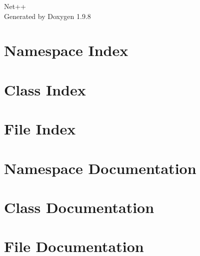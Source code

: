 \documentclass[twoside]{book}
\newcommand{\+}{\discretionary{\mbox{\scriptsize$\hookleftarrow$}}{}{}}
\newcommand{\clearemptydoublepage}{%
    \newpage{\pagestyle{empty}\cleardoublepage}%
  }
\begin{document}
  \raggedbottom
    \hypersetup{pageanchor=false,
                bookmarksnumbered=true,
                pdfencoding=unicode
               }
  \begin{titlepage}
  \vspace*{7cm}
  \begin{center}%
  {\Large Net++}\\
  \vspace*{1cm}
  {\large Generated by Doxygen 1.9.8}\\
  \end{center}
  \end{titlepage}
  \clearemptydoublepage
  \tableofcontents
  \clearemptydoublepage
  \hypersetup{pageanchor=true}
\chapter{Namespace Index}

\chapter{Class Index}

\chapter{File Index}

\chapter{Namespace Documentation}







\chapter{Class Documentation}






\chapter{File Documentation}








  \backmatter
  \newpage
  \clearemptydoublepage
  \printindex
\end{document}
